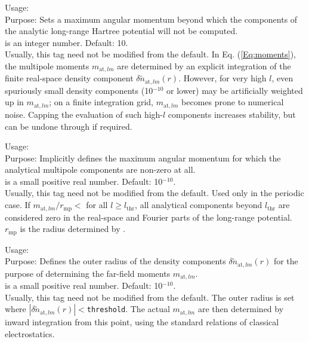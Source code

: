 {
  \noindent
  Usage:   \\[1.0ex]
  Purpose: Sets a maximum angular momentum beyond which the components of the
  analytic long-range Hartree potential will not be computed. \\[1.0ex]
   is an integer number. Default: 10. \\
}
Usually, this tag need not be modified from the default. In
Eq. (\ref{Eq:moments}), the multipole moments $m_{\text{at},lm}$ are
determined by an explicit integration of the finite real-space density
component $\delta\tilde{n}_{\text{at},lm}(r)$. However, for very high $l$,
even spuriously small density components (10$^{-10}$ or lower) may be
artificially weighted up in $m_{\text{at},lm}$; on a finite integration grid,
$m_{\text{at},lm}$ becomes prone to numerical noise. Capping the evaluation of
such high-$l$ components increases stability, but can be undone through
   if required.

{
  \noindent
  Usage:   \\[1.0ex]
  Purpose: Implicitly defines the maximum angular momentum for which
    the analytical multipole components are non-zero at all. \\[1.0ex]
   is a small positive real number. Default:
  10$^{-10}$. \\
}
Usually, this tag need not be modified from the default. Used only in
the periodic case. If $m_{\text{at},lm}/r_\text{mp}<$ for all
$l\ge l_\text{thr}$, all analytical components beyond $l_\text{thr}$
are considered zero in the real-space and Fourier parts of the
long-range potential. $r_\text{mp}$ is the radius determined by
. 

{
  \noindent
  Usage:  
    \\[1.0ex]
  Purpose: Defines the outer radius of the density
    components $\delta\tilde{n}_{\text{at},lm}(r)$ for the purpose of
    determining the far-field moments $m_{\text{at},lm}$. \\[1.0ex]
   is a small positive real number. Default:
    10$^{-10}$. \\
}
Usually, this tag need not be modified from the default. The outer
radius is set where
$|\delta\tilde{n}_{\text{at},lm}(r)|<$\texttt{threshold}. The actual
$m_{\text{at},lm}$ are then determined by inward integration from
this point, using the standard relations of classical electrostatics.

